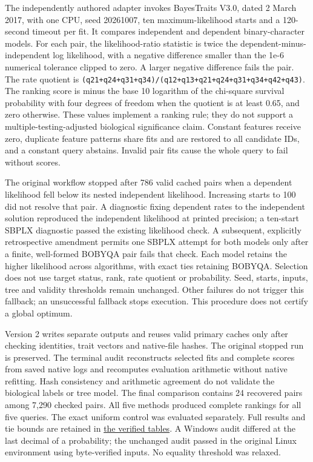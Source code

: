 \documentclass[
  10pt,
  a4paper,
]{article}
\begin{document}
The independently authored adapter invokes BayesTraits V3.0, dated 2 March 2017, with one CPU, seed 20261007, ten maximum-likelihood starts and a 120-second timeout per fit. It compares independent and dependent binary-character models. For each pair, the likelihood-ratio statistic is twice the dependent-minus-independent log likelihood, with a negative difference smaller than the 1e-6 numerical tolerance clipped to zero. A larger negative difference fails the pair. The rate quotient is \nolinkurl{(q21+q24+q31+q34)/(q12+q13+q21+q24+q31+q34+q42+q43)}. The ranking score is minus the base 10 logarithm of the chi-square survival probability with four degrees of freedom when the quotient is at least 0.65, and zero otherwise. These values implement a ranking rule; they do not support a multiple-testing-adjusted biological significance claim. Constant features receive zero, duplicate feature patterns share fits and are restored to all candidate IDs, and a constant query abstains. Invalid pair fits cause the whole query to fail without scores.

The original workflow stopped after 786 valid cached pairs when a dependent likelihood fell below its nested independent likelihood. Increasing starts to 100 did not resolve that pair. A diagnostic fixing dependent rates to the independent solution reproduced the independent likelihood at printed precision; a ten-start SBPLX diagnostic passed the existing likelihood check. A subsequent, explicitly retrospective amendment permits one SBPLX attempt for both models only after a finite, well-formed BOBYQA pair fails that check. Each model retains the higher likelihood across algorithms, with exact ties retaining BOBYQA. Selection does not use target status, rank, rate quotient or probability. Seed, starts, inputs, tree and validity thresholds remain unchanged. Other failures do not trigger this fallback; an unsuccessful fallback stops execution. This procedure does not certify a global optimum.

Version 2 writes separate outputs and reuses valid primary caches only after checking identities, trait vectors and native-file hashes. The original stopped run is preserved. The terminal audit reconstructs selected fits and complete scores from saved native logs and recomputes evaluation arithmetic without native refitting. Hash consistency and arithmetic agreement do not validate the biological labels or tree model. The final comparison contains 24 recovered pairs among 7,290 checked pairs. All five methods produced complete rankings for all five queries. The exact uniform control was evaluated separately. Full results and tie bounds are retained in \href{https://github.com/vinvomero/fungallink-benchmark/blob/main/manuscript/tables/phylogeny-comparison-v2/README.md}{the verified tables}. A Windows audit differed at the last decimal of a probability; the unchanged audit passed in the original Linux environment using byte-verified inputs. No equality threshold was relaxed.
\end{document}
